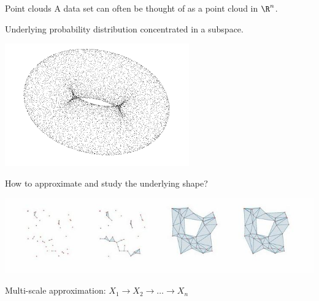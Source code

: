 
\begin{frame}{Point clouds}
	A data set can often be thought of as a point cloud in $\R^n$.

	\vskip 8pt

	Underlying probability distribution concentrated in a subspace.

	\vspace*{-5pt}

	\begin{center}
		\includegraphics[scale=.3]{aux/torus}
	\end{center}

	\vspace*{-10pt} \pause

	How to approximate and study the underlying shape?

	\begin{center}
		\includegraphics[scale=.4]{aux/filtration}
	\end{center}

	\vskip-15pt
	\textcolor{pblue}{Multi-scale approximation:} $X_1 \to X_2 \to \dots \to X_n$
\end{frame}

